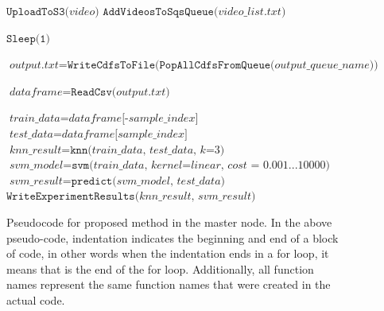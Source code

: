 \begin{figure}[h]
\begin{algorithmic}[1]

    \State $\texttt{UploadToS3(}\textit{video}\texttt{)}$
  \EndFor
  \State $\texttt{AddVideosToSqsQueue(}\textit{video\_list.txt}\texttt{)}$

    \State $\texttt{Sleep(1)}$
  \EndWhile

  \State $\textit{output.txt} = \texttt{WriteCdfsToFile(PopAllCdfsFromQueue(}\textit{output\_queue\_name} \texttt{))}$

  \State $\textit{dataframe} = \texttt{ReadCsv(} \textit{output.txt} \texttt{)}$

   
    \State $\textit{train\_data} = \textit{dataframe[-sample\_index]}$
    \State $\textit{test\_data} = \textit{dataframe[sample\_index]}$
    \State $\textit{knn\_result} = \texttt{knn(}\textit{train\_data, test\_data, k=3} \texttt{)}$
    \State $\textit{svm\_model} = \texttt{svm(}\textit{train\_data, kernel=linear, cost = 0.001...10000} \textit{)}$
    \State $\textit{svm\_result} = \texttt{predict(} \textit{svm\_model, test\_data} \texttt{)}$
  \EndFor
  \State $\texttt{WriteExperimentResults(} \textit{knn\_result, svm\_result} \texttt{)}$

\end{algorithmic}

\caption{Pseudocode for proposed method in the master node. In the above pseudo-code, indentation
indicates the beginning and end of a block of code, in other words when the
indentation ends in a for loop, it means that is the end of the for loop. Additionally,
all function names represent the same function names that were created in the actual
code.}
\label{alg:pseudo_master_node}

\end{figure}

\FloatBarrier

